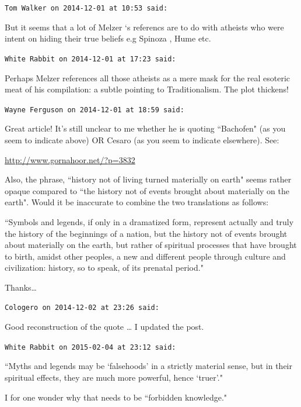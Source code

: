 \begin{footnotesize}\begin{sffamily}



\texttt{Tom Walker on 2014-12-01 at 10:53 said: }

But it seems that a lot of Melzer `s referencs are to do with atheists who were intent on hiding their true beliefs e.g Spinoza , Hume etc.


\hfill

\texttt{White Rabbit on 2014-12-01 at 17:23 said: }

Perhaps Melzer references all those atheists as a mere mask for the real esoteric meat of his compilation: a subtle pointing to Traditionalism. The plot thickens!


\hfill

\texttt{Wayne Ferguson on 2014-12-01 at 18:59 said: }

Great article! It's still unclear to me whether he is quoting ``Bachofen" (as you seem to indicate above) OR Cesaro (as you seem to indicate elsewhere). See:

\url{http://www.gornahoor.net/?p=3832}

Also, the phrase, ``history not of living turned materially on earth" seems rather opaque compared to ``the history not of events brought about materially on the earth". Would it be inaccurate to combine the two translations as follows:

``Symbols and legends, if only in a dramatized form, represent actually and truly the history of the beginnings of a nation, but the history not of events brought about materially on the earth, but rather of spiritual processes that have brought to birth, amidst other peoples, a new and different people through culture and civilization: history, so to speak, of its prenatal period."

Thanks…


\hfill

\texttt{Cologero on 2014-12-02 at 23:26 said: }

Good reconstruction of the quote … I updated the post.


\hfill

\texttt{White Rabbit on 2015-02-04 at 23:12 said: }

``Myths and legends may be `falsehoods' in a strictly material sense, but in their spiritual effects, they are much more powerful, hence `truer'."

I for one wonder why that needs to be ``forbidden knowledge."



\end{sffamily}
\end{footnotesize}
